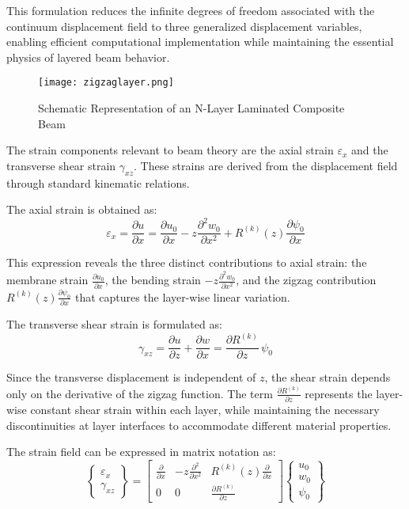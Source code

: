 \documentclass[12pt,a4paper]{report}
\begin{document}
This formulation reduces the infinite degrees of freedom associated with the continuum displacement field to three generalized displacement variables, enabling efficient computational implementation while maintaining the essential physics of layered beam behavior.

\begin{figure}[htbp]
\centering
\texttt{[image: zigzaglayer.png]}
\caption{Schematic Representation of an
N-Layer Laminated Composite Beam}
\label{fig:zigzag_layer}
\end{figure}

The strain components relevant to beam theory are the axial strain $\varepsilon_x$ and the transverse shear strain $\gamma_{xz}$. These strains are derived from the displacement field through standard kinematic relations.

The axial strain is obtained as:
\begin{equation}
\varepsilon_x = \frac{\partial u}{\partial x} 
= \frac{\partial u_0}{\partial x} 
- z \frac{\partial^2 w_0}{\partial x^2} 
+ R^{(k)}(z) \frac{\partial \psi_0}{\partial x}
\end{equation}

This expression reveals the three distinct contributions to axial strain: the membrane strain 
$\frac{\partial u_0}{\partial x}$, the bending strain 
$- z \frac{\partial^2 w_0}{\partial x^2}$, and the zigzag contribution 
$R^{(k)}(z) \frac{\partial \psi_0}{\partial x}$ that captures the layer-wise linear variation.

The transverse shear strain is formulated as:
\begin{equation}
\gamma_{xz} = \frac{\partial u}{\partial z} + \frac{\partial w}{\partial x} 
= \frac{\partial R^{(k)}}{\partial z} \, \psi_0 
\end{equation}

Since the transverse displacement is independent of $z$, the shear strain depends only on the derivative of the zigzag function. The term 
$\frac{\partial R^{(k)}}{\partial z}$ represents the layer-wise constant shear strain within each layer, while maintaining the necessary discontinuities at layer interfaces to accommodate different material properties.

The strain field can be expressed in matrix notation as:
\begin{equation}
\begin{Bmatrix} \varepsilon_x \\ \gamma_{xz} \end{Bmatrix} =
\begin{bmatrix} 
\frac{\partial}{\partial x} & -z \frac{\partial^2}{\partial x^2} & R^{(k)}(z) \frac{\partial}{\partial x} \\
0 & 0 & \frac{\partial R^{(k)}}{\partial z} 
\end{bmatrix}
\begin{Bmatrix} u_0 \\ w_0 \\ \psi_0 \end{Bmatrix}
\end{equation}
\end{document}
